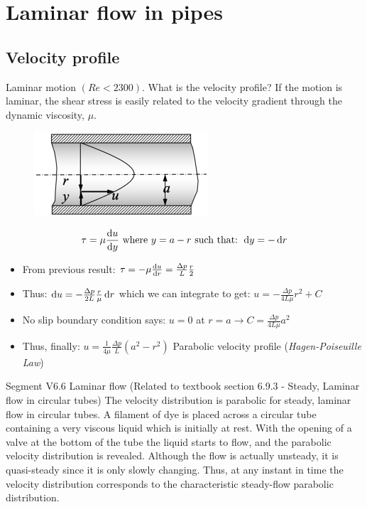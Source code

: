 \documentclass[class=report, crop=false, 12pt,a4paper]{standalone}
\begin{document}
\section{Laminar flow in pipes}
\subsection{Velocity profile}
Laminar motion $\left(Re < 2300\right)$. What is the velocity profile? If the motion is laminar, the shear stress is easily related to the velocity gradient through the dynamic viscosity, $\mu$.
\begin{figure}[H]
  \centering
  \includegraphics[width = 0.3 \textwidth]{../img/diagram82.png}
  \caption{}
\end{figure}
\begin{equation}
  \tau = \mu \frac{\dif u}{\dif y} \textrm{ where } y = a-r \textrm{ such that: } \dif y = -\dif r
\end{equation}
\begin{itemize}
  \item From previous result: $\tau = - \mu \frac{\dif u}{\dif r} = \frac{\Delta p}{L} \frac{r}{2}$
  \item Thus: $\dif u = - \frac{\Delta p}{2L} \frac{r}{\mu} \dif r$ which we can integrate to get: $u = - \frac{\Delta p}{4L\mu} r^2 + C$
  \item No slip boundary condition says: $u = 0$ at $ r = a \rightarrow C = \frac{\Delta p}{4 L \mu} a^2$
  \item Thus, finally: $u = \frac{1}{4\mu} \frac{\Delta p}{L} \left(a^2 - r^2\right)$ Parabolic velocity profile (\textit{Hagen-Poiseuille Law})
\end{itemize}
Segment V6.6 Laminar flow (Related to textbook section 6.9.3 - Steady, Laminar flow in circular tubes) The velocity distribution is parabolic for steady, laminar flow in circular tubes. A filament of dye is placed across a circular tube containing a very viscous liquid which is initially at rest. With the opening of a valve at the bottom of the tube the liquid starts to flow, and the parabolic velocity distribution is revealed. Although the flow is actually unsteady, it is quasi-steady since it is only slowly changing. Thus, at any instant in time the velocity distribution corresponds to the characteristic steady-flow parabolic distribution.
\end{document}
